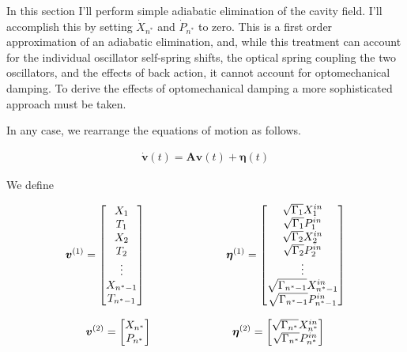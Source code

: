 \documentclass[12pt]{article}
\newcommand{\bv}[1]{\boldsymbol{#1}}
\begin{document}
In this section I'll perform simple adiabatic elimination of the cavity field. I'll accomplish this by setting $\dot{X}_{n^*}$ and $\dot{P}_{n^*}$ to zero. This is a first order approximation of an adiabatic elimination, and, while this treatment can account for the individual oscillator self-spring shifts, the optical spring coupling the two oscillators, and the effects of back action, it cannot account for optomechanical damping. To derive the effects of optomechanical damping a more sophisticated approach must be taken.

In any case, we rearrange the equations of motion as follows.

\begin{align}
\dot{\bv{v}}(t) = \bv{A}\bv{v}(t) + \bv{\eta}(t)
\end{align}

We define

\begin{align}
\bv{v}^{(1)} =
\begin{bmatrix}
X_1\\
T_1\\
X_2\\
T_2\\
\vdots\\
X_{n^*-1}\\
T_{n^*-1}
\end{bmatrix}
\hspace{1 in}
\bv{\eta}^{(1)} =
\begin{bmatrix}
\sqrt{\Gamma_1}X^{in}_1\\
\sqrt{\Gamma_1}P^{in}_1\\
\sqrt{\Gamma_2}X^{in}_2\\
\sqrt{\Gamma_2}P^{in}_2\\
\vdots\\
\sqrt{\Gamma_{n^*-1}}X^{in}_{n^*-1}\\
\sqrt{\Gamma_{n^*-1}}P^{in}_{n^*-1}
\end{bmatrix}
\end{align}

\begin{align}
\bv{v}^{(2)} =
\begin{bmatrix}
X_{n^*}\\
P_{n^*}
\end{bmatrix}
\hspace{1 in}
\bv{\eta}^{(2)} =
\begin{bmatrix}
\sqrt{\Gamma_{n^*}}X^{in}_{n^*}\\
\sqrt{\Gamma_{n^*}}P^{in}_{n^*}
\end{bmatrix}
\end{align}
\end{document}

